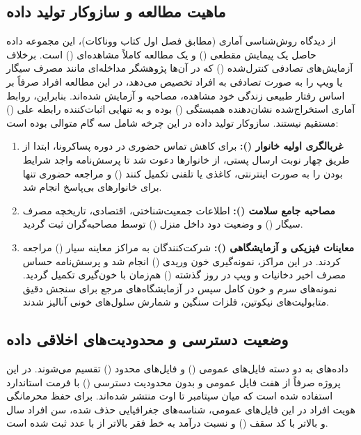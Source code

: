 \documentclass[12pt]{exam}
\begin{document}
\subsection{ماهیت مطالعه و سازوکار تولید داده}
از دیدگاه روش‌شناسی آماری (مطابق فصل اول کتاب ووناکات)، این مجموعه داده حاصل یک پیمایش مقطعی () و یک مطالعه کاملاً مشاهده‌ای () است. برخلاف آزمایش‌های تصادفی کنترل‌شده () که در آن‌ها پژوهشگر مداخله‌ای مانند مصرف سیگار یا ویپ را به صورت تصادفی به افراد تخصیص می‌دهد، در این مطالعه افراد صرفاً بر اساس رفتار طبیعی زندگی خود مشاهده، مصاحبه و آزمایش شده‌اند. بنابراین، روابط آماری استخراج‌شده نشان‌دهنده همبستگی () بوده و به تنهایی اثبات‌کننده رابطه علی () مستقیم نیستند. سازوکار تولید داده در این چرخه شامل سه گام متوالی بوده است:
\begin{enumerate}
\item \textbf{غربالگری اولیه خانوار ():} برای کاهش تماس حضوری در دوره پساکرونا، ابتدا از طریق چهار نوبت ارسال پستی، از خانوارها دعوت شد تا پرسش‌نامه واجد شرایط بودن را به صورت اینترنتی، کاغذی یا تلفنی تکمیل کنند () و مراجعه حضوری تنها برای خانوارهای بی‌پاسخ انجام شد.
\item \textbf{مصاحبه جامع سلامت ():} اطلاعات جمعیت‌شناختی، اقتصادی، تاریخچه مصرف سیگار () و وضعیت دود داخل منزل () توسط مصاحبه‌گران ثبت گردید.
\item \textbf{معاینات فیزیکی و آزمایشگاهی ():} شرکت‌کنندگان به مراکز معاینه سیار () مراجعه کردند. در این مراکز، نمونه‌گیری خون وریدی () انجام شد و پرسش‌نامه حساس مصرف اخیر دخانیات و ویپ در  روز گذشته () هم‌زمان با خون‌گیری تکمیل گردید. نمونه‌های سرم و خون کامل سپس در آزمایشگاه‌های مرجع برای سنجش دقیق متابولیت‌های نیکوتین، فلزات سنگین و شمارش سلول‌های خونی آنالیز شدند.
\end{enumerate}

\subsection{وضعیت دسترسی و محدودیت‌های اخلاقی داده}
داده‌های  به دو دسته فایل‌های عمومی () و فایل‌های محدود () تقسیم می‌شوند. در این پروژه صرفاً از هفت فایل عمومی و بدون محدودیت دسترسی () با فرمت استاندارد  استفاده شده است که میان سپتامبر  تا اوت  منتشر شده‌اند. برای حفظ محرمانگی هویت افراد در این فایل‌های عمومی، شناسه‌های جغرافیایی حذف شده، سن افراد  سال و بالاتر با کد سقف  () و نسبت درآمد به خط فقر بالاتر از  با عدد  ثبت شده است.
\end{document}
